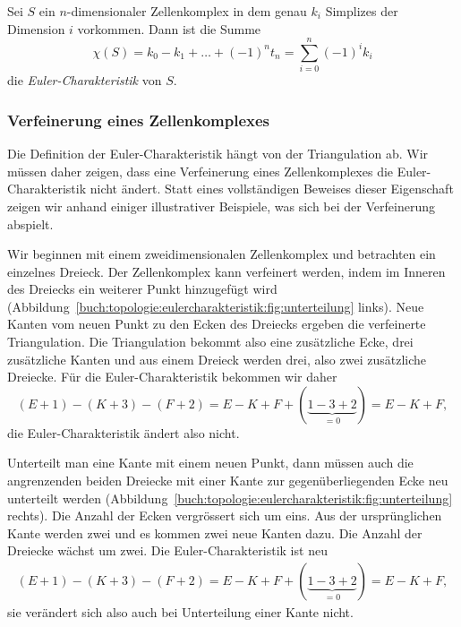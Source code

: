 \begin{definition}
Sei $S$ ein $n$-dimensionaler Zellenkomplex in dem
genau $k_i$ Simplizes der Dimension $i$ vorkommen.
Dann ist die Summe
\[
\chi(S)
=
k_0 - k_1 + \dots + (-1)^n t_n
=
\sum_{i=0}^n (-1)^i k_i
\]
die \emph{Euler-Charakteristik} von $S$.
%
%
%
%
\end{definition}

%
%
\subsubsection{Verfeinerung eines Zellenkomplexes}
Die Definition der Euler-Charakteristik hängt von der Triangulation ab.
Wir müssen daher zeigen, dass eine Verfeinerung eines Zellenkomplexes die
Euler-Charakteristik nicht ändert.
Statt eines vollständigen Beweises dieser Eigenschaft zeigen wir anhand
einiger illustrativer Beispiele, was sich bei der Verfeinerung
abspielt.
%

Wir beginnen mit einem zweidimensionalen Zellenkomplex
und betrachten ein einzelnes Dreieck.
Der Zellenkomplex kann verfeinert werden, indem im Inneren des
Dreiecks ein weiterer Punkt hinzugefügt wird
(Abbildung~\ref{buch:topologie:eulercharakteristik:fig:unterteilung} links).
Neue Kanten vom neuen Punkt zu den Ecken des Dreiecks ergeben die
verfeinerte Triangulation.
Die Triangulation bekommt also eine zusätzliche Ecke, drei zusätzliche
Kanten und aus einem Dreieck werden drei, also zwei zusätzliche Dreiecke.
Für die Euler-Charakteristik bekommen wir daher
\[
(E+1) - (K+3) - (F+2)
=
E-K+F+(\underbrace{1-3+2}_{\displaystyle=0})
=
E-K+F,
\]
die Euler-Charakteristik ändert also nicht.

Unterteilt man eine Kante mit einem neuen Punkt, dann müssen auch
die angrenzenden beiden Dreiecke mit einer Kante zur gegenüberliegenden
Ecke neu unterteilt werden
(Abbildung~\ref{buch:topologie:eulercharakteristik:fig:unterteilung} rechts).
Die Anzahl der Ecken vergrössert sich um eins.
Aus der ursprünglichen Kante werden zwei und es kommen zwei neue Kanten
dazu.
Die Anzahl der Dreiecke wächst um zwei.
Die Euler-Charakteristik ist neu
\begin{align*}
(E+1) - (K+3) - (F+2)
=
E-K+F +(\underbrace{1-3+2}_{\displaystyle=0})
=
E-K+F,
\end{align*}
sie verändert sich also auch bei Unterteilung einer Kante nicht.

